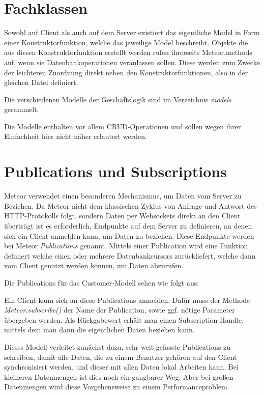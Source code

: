 \section{Fachklassen}

Sowohl auf Client als auch auf dem Server existiert das eigentliche Model in
Form einer Konstruktorfunktion, welche das jeweilige Model beschreibt. Objekte
die aus diesen Konstruktorfunktion erstellt werden rufen ihrerseits
Meteor.methods auf, wenn sie Datenbankoperationen veranlassen sollen. Diese
werden zum Zwecke der leichteren Zuordnung direkt neben den
Konstruktorfunktionen, also in der gleichen Datei definiert.

Die verschiedenen Modelle der Geschäftslogik sind im Verzeichnis \textit{models}
gesammelt.

Die Modelle enthalten vor allem CRUD-Operationen und sollen wegen ihrer
Einfachheit hier nicht näher erlautert werden.

\section{Publications und Subscriptions}

Meteor verwendet einen besonderen Mechanismus, um Daten vom Server zu Beziehen.
Da Meteor nicht dem klassischen Zyklus von Anfrage und Antwort des
HTTP-Protokolls folgt, sondern Daten per Websockets direkt an den Client
überträgt ist es erforderlich, Endpunkte auf dem Server zu definieren, an denen
sich ein Client anmelden kann, um Daten zu beziehen. Diese Endpunkte werden bei
Meteor \textit{Publications} genannt. Mittels einer Publication wird eine
Funktion  definiert welche einen oder mehrere Datenbankcursors zurückliefert,
welche dann vom Client genutzt werden können, um Daten abzurufen.

Die Publications für das Customer-Modell sehen wie folgt aus:



Ein Client kann sich an diese Publications anmelden. Dafür muss der Methode
\textit{Meteor.subscribe()} der Name der Publication, sowie ggf. nötige
Parameter übergeben werden. Als Rückgabewert erhält man einen
Subscription-Handle, mittels dem man dann die eigentlichen Daten beziehen kann.

Dieses Modell verleitet zunächst dazu, sehr weit gefasste Publications zu
schreiben, damit alle Daten, die zu einem Benutzer gehören auf den Client
synchronisiert werden, und dieser mit allen Daten lokal Arbeiten kann. Bei kleineren
Datenmengen ist dies noch ein gangbarer Weg. Aber bei großen Datenmengen wird diese
Vorgehensweise zu einem Performanceproblem.


